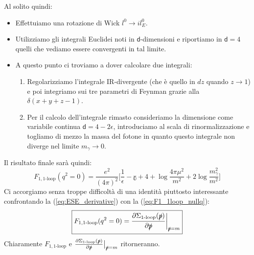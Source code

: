 \documentclass[../main.tex]{subfiles}
\begin{document}
\begin{exercise}
    Al solito quindi:
    \begin{itemize}
        \item Effettuiamo una rotazione di Wick $l^0 \rightarrow il^0_E$.
        \item Utilizziamo gli integrali Euclidei noti in $\mathsf d$-dimensioni e riportiamo in $\mathsf d=4$ quelli che            vediamo essere convergenti in tal limite. 
        \item A questo punto ci troviamo a dover calcolare due integrali:
        \begin{enumerate}
            \item Regolarizziamo l'integrale IR-divergente (che è quello in $dz$ quando $z\rightarrow 1$) e poi integriamo sui tre parametri di Feynman grazie alla $\delta(x+y+z-1)$.
            \item Per il calcolo dell'integrale rimasto consideriamo la dimensione come variabile continua $\mathsf d = 4 -2\epsilon$, introduciamo al scala di rinormalizzazione e togliamo di mezzo la massa del fotone in quanto questo integrale non diverge nel limite $m_\gamma\rightarrow 0$.
        \end{enumerate}
    \end{itemize}
    Il risultato finale sarà quindi:
    \begin{equation}
        F_{1,\text{1-loop}}(q^2=0) = \frac{e^2}{(4\pi)^2} \bigg[\frac{1}{\epsilon} - \mathbb \gamma + 4 + \log{\frac{4\pi\mu^2}{m^2}} + 2\log{\frac{m_\gamma^2}{m^2}}\bigg]
        \label{eq:F1_1loop_nullq}
    \end{equation}
    Ci accorgiamo senza troppe difficoltà di una identità piuttosto interessante confrontando la (\ref{eq:ESE_derivative}) con la (\ref{eq:F1_1loop_nullq}):
    \begin{equation}
        \boxed{
         F_{1,\text{1-loop}}(q^2=0) = \frac{\partial \Sigma_\text{1-loop} (\slashed p)}{\partial\slashed p}\bigg|_{\slashed p = m}
        }
        \label{eq:formfactor_ESEder_identity}
    \end{equation}
    Chiaramente $F_{1,\text{1-loop}}$ e $\frac{\partial \Sigma_\text{1-loop} (\slashed p)}{\partial\slashed p}\big|_{\slashed p = m}$ ritorneranno.
    \label{ex:1loop_formfactor1}
\end{exercise}
\end{document}

